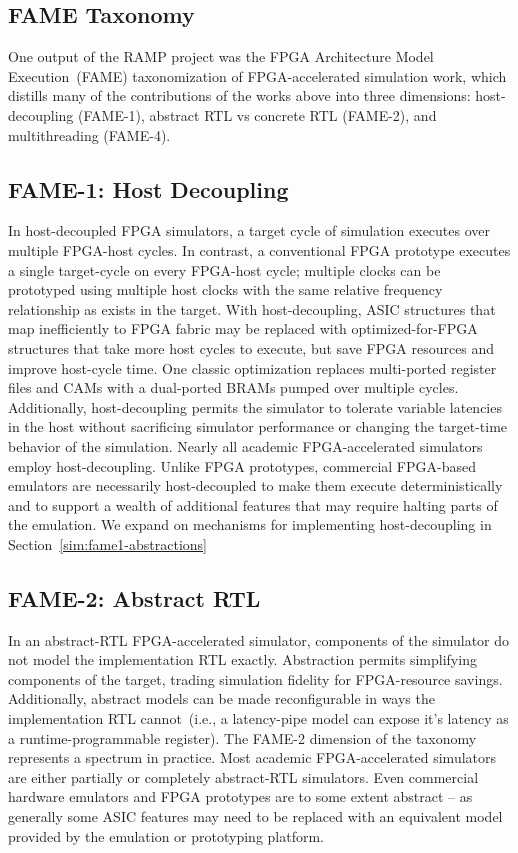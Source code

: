 \subsection{FAME Taxonomy}

One output of the RAMP project was the FPGA Architecture Model
Execution~(FAME)\cite{FAME} taxonomization of FPGA-accelerated simulation work,
which distills many of the contributions of the works above into three dimensions: host-decoupling (FAME-1), abstract RTL vs concrete RTL
(FAME-2), and multithreading (FAME-4).

\subsection{FAME-1: Host Decoupling}\label{sec:fame1}

In host-decoupled FPGA simulators, a target cycle of simulation
executes over multiple FPGA-host cycles. In contrast, a
conventional FPGA prototype executes a single target-cycle on every FPGA-host
cycle; multiple clocks can be prototyped using multiple host clocks with the
same relative frequency relationship as exists in the target.
With host-decoupling, ASIC structures that map inefficiently to FPGA fabric may be replaced
with optimized-for-FPGA structures that take more host cycles to execute, but save
FPGA resources and improve host-cycle time.  One classic optimization replaces
multi-ported register files and CAMs with a dual-ported BRAMs pumped over
multiple cycles.  Additionally, host-decoupling permits the simulator to
tolerate variable latencies in the host without sacrificing simulator
performance or changing the target-time behavior of the simulation.
Nearly all academic FPGA-accelerated simulators employ host-decoupling.
Unlike FPGA prototypes, commercial FPGA-based emulators are necessarily host-decoupled to
make them execute deterministically and to support a wealth of additional features that may require
halting parts of the emulation. We expand on mechanisms for implementing host-decoupling in Section~\ref{sim:fame1-abstractions}

\subsection{FAME-2: Abstract RTL}

In an abstract-RTL FPGA-accelerated simulator, components of the simulator do
not model the implementation RTL exactly. Abstraction permits simplifying
components of the target, trading simulation fidelity for FPGA-resource
savings. Additionally, abstract models can be made reconfigurable in ways the
implementation RTL cannot~(i.e., a latency-pipe model can expose it's latency
as a runtime-programmable register).  The FAME-2 dimension of the taxonomy
represents a spectrum in practice.  Most academic FPGA-accelerated simulators
are either partially or completely abstract-RTL simulators.  Even commercial
hardware emulators and FPGA prototypes are to some extent abstract -- as
generally some ASIC features may need to be replaced with an equivalent model
provided by the emulation or prototyping platform.

